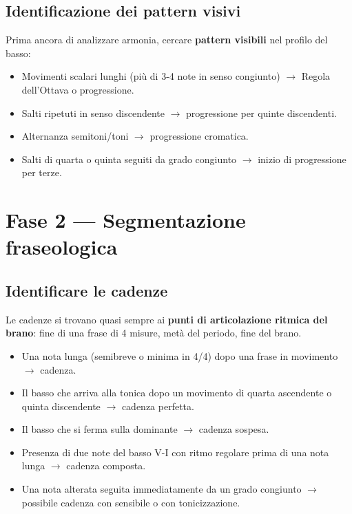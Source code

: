 \subsection{Identificazione dei pattern visivi}

Prima ancora di analizzare armonia, cercare \textbf{pattern visibili} nel profilo del basso:
\begin{itemize}
	\item Movimenti scalari lunghi (più di 3-4 note in senso congiunto) $\rightarrow$ Regola dell'Ottava o progressione.
	\item Salti ripetuti in senso discendente $\rightarrow$ progressione per quinte discendenti.
	\item Alternanza semitoni/toni $\rightarrow$ progressione cromatica.
	\item Salti di quarta o quinta seguiti da grado congiunto $\rightarrow$ inizio di progressione per terze.
\end{itemize}

\section{Fase 2 — Segmentazione fraseologica}
\label{sec:fase2_basso}

\subsection{Identificare le cadenze}

Le cadenze si trovano quasi sempre ai \textbf{punti di articolazione ritmica del brano}: fine di una frase di 4 misure, metà del periodo, fine del brano.

\begin{regola}
	\label{reg:segnali_cadenza}
	\begin{itemize}
		\item Una nota lunga (semibreve o minima in 4/4) dopo una frase in movimento $\rightarrow$ cadenza.
		\item Il basso che arriva alla tonica dopo un movimento di quarta ascendente o quinta discendente $\rightarrow$ cadenza perfetta.
		\item Il basso che si ferma sulla dominante $\rightarrow$ cadenza sospesa.
		\item Presenza di due note del basso V-I con ritmo regolare prima di una nota lunga $\rightarrow$ cadenza composta.
		\item Una nota alterata seguita immediatamente da un grado congiunto $\rightarrow$ possibile cadenza con sensibile o con tonicizzazione.
	\end{itemize}
\end{regola}

